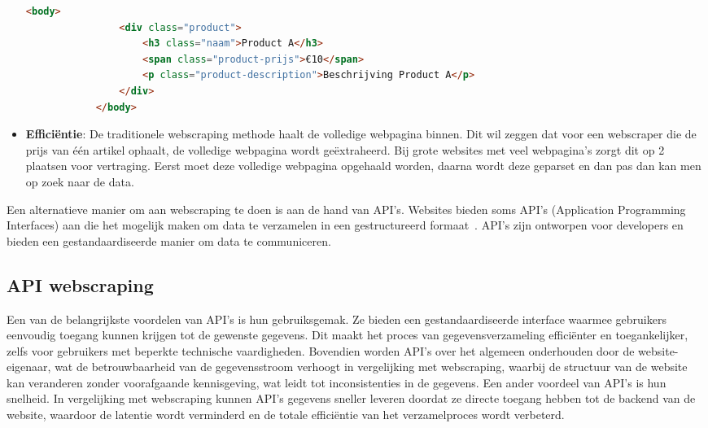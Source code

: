 \begin{itemize}
\begin{listing}
        \begin{lstlisting}[language=HTML,caption={HTML voorbeeld 2},label={code:HTML2}]
            <body>
                <div class="product">
                    <h3 class="naam">Product A</h3>
                    <span class="product-prijs">€10</span>
                    <p class="product-description">Beschrijving Product A</p>
                </div>
            </body>
        \end{lstlisting}
    \end{listing}

    \item \textbf{Efficiëntie}: De traditionele webscraping methode haalt de volledige webpagina binnen. Dit wil zeggen dat voor een webscraper die de prijs van één artikel ophaalt, de volledige webpagina wordt geëxtraheerd. Bij grote websites met veel webpagina's zorgt dit op 2 plaatsen voor vertraging. Eerst moet deze volledige webpagina opgehaald worden, daarna wordt deze geparset en dan pas dan kan men op zoek naar de data.
\end{itemize}

Een alternatieve manier om aan webscraping te doen is aan de hand van API's. Websites bieden soms API's (Application Programming Interfaces) aan die het mogelijk maken om data te verzamelen in een gestructureerd formaat~\autocite{Ayushi2021}. API's zijn ontworpen voor developers en bieden een gestandaardiseerde manier om data te communiceren.

\subsection{API webscraping}

Een van de belangrijkste voordelen van API's is hun gebruiksgemak. Ze bieden een gestandaardiseerde interface waarmee gebruikers eenvoudig toegang kunnen krijgen tot de gewenste gegevens. Dit maakt het proces van gegevensverzameling efficiënter en toegankelijker, zelfs voor gebruikers met beperkte technische vaardigheden. Bovendien worden API's over het algemeen onderhouden door de website-eigenaar, wat de betrouwbaarheid van de gegevensstroom verhoogt in vergelijking met webscraping, waarbij de structuur van de website kan veranderen zonder voorafgaande kennisgeving, wat leidt tot inconsistenties in de gegevens. Een ander voordeel van API's is hun snelheid. In vergelijking met webscraping kunnen API's gegevens sneller leveren doordat ze directe toegang hebben tot de backend van de website, waardoor de latentie wordt verminderd en de totale efficiëntie van het verzamelproces wordt verbeterd.
\vspace{5mm} %

